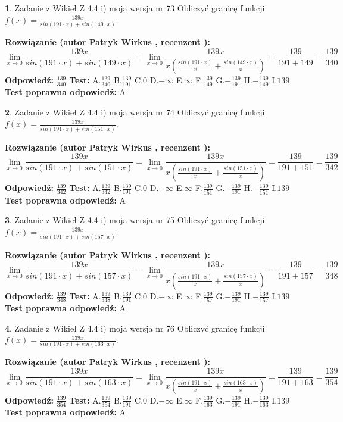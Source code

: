 \documentclass[12pt, a4paper]{article}
\theoremstyle{definition} %
\newtheorem{zad}{}
\newcommand{\zadStart}[1]{\begin{zad}#1\newline}
\newcommand{\zadStop}{\end{zad}}
\newcommand{\rozwStart}[2]{\noindent \textbf{Rozwiązanie (autor #1 , recenzent #2): }\newline}
\newcommand{\rozwStop}{\newline}
\newcommand{\odpStart}{\noindent \textbf{Odpowiedź:}\newline}
\newcommand{\odpStop}{\newline}
\newcommand{\testStart}{\noindent \textbf{Test:}\newline}
\newcommand{\testStop}{\newline}
\newcommand{\kluczStart}{\noindent \textbf{Test poprawna odpowiedź:}\newline}
\newcommand{\kluczStop}{\newline}
\begin{document}
\zadStart{Zadanie z Wikieł Z 4.4 i) moja wersja nr 73}
Obliczyć granicę funkcji $f(x)=\frac{139x}{sin(191\cdot x) +sin(149\cdot x)}$.
\zadStop
\rozwStart{Patryk Wirkus}{}
$$\lim\limits_{x\to 0}\frac{139x}{sin(191\cdot x) +sin(149\cdot x)}=\lim\limits_{x\to 0}\frac{139x}{x(\frac{sin(191\cdot x)}{x}+\frac{sin(149\cdot x)}{x})}=\frac{139}{191+149} = \frac{139}{340}$$
\rozwStop
\odpStart
$\frac{139}{340}$
\odpStop
\testStart
A.$\frac{139}{340}$
B.$\frac{139}{191}$
C.$0$
D.$-\infty$
E.$\infty$
F.$\frac{139}{149}$
G.$-\frac{139}{191}$
H.$-\frac{139}{149}$
I.$139$
\testStop
\kluczStart
A
\kluczStop



\zadStart{Zadanie z Wikieł Z 4.4 i) moja wersja nr 74}
Obliczyć granicę funkcji $f(x)=\frac{139x}{sin(191\cdot x) +sin(151\cdot x)}$.
\zadStop
\rozwStart{Patryk Wirkus}{}
$$\lim\limits_{x\to 0}\frac{139x}{sin(191\cdot x) +sin(151\cdot x)}=\lim\limits_{x\to 0}\frac{139x}{x(\frac{sin(191\cdot x)}{x}+\frac{sin(151\cdot x)}{x})}=\frac{139}{191+151} = \frac{139}{342}$$
\rozwStop
\odpStart
$\frac{139}{342}$
\odpStop
\testStart
A.$\frac{139}{342}$
B.$\frac{139}{191}$
C.$0$
D.$-\infty$
E.$\infty$
F.$\frac{139}{151}$
G.$-\frac{139}{191}$
H.$-\frac{139}{151}$
I.$139$
\testStop
\kluczStart
A
\kluczStop



\zadStart{Zadanie z Wikieł Z 4.4 i) moja wersja nr 75}
Obliczyć granicę funkcji $f(x)=\frac{139x}{sin(191\cdot x) +sin(157\cdot x)}$.
\zadStop
\rozwStart{Patryk Wirkus}{}
$$\lim\limits_{x\to 0}\frac{139x}{sin(191\cdot x) +sin(157\cdot x)}=\lim\limits_{x\to 0}\frac{139x}{x(\frac{sin(191\cdot x)}{x}+\frac{sin(157\cdot x)}{x})}=\frac{139}{191+157} = \frac{139}{348}$$
\rozwStop
\odpStart
$\frac{139}{348}$
\odpStop
\testStart
A.$\frac{139}{348}$
B.$\frac{139}{191}$
C.$0$
D.$-\infty$
E.$\infty$
F.$\frac{139}{157}$
G.$-\frac{139}{191}$
H.$-\frac{139}{157}$
I.$139$
\testStop
\kluczStart
A
\kluczStop



\zadStart{Zadanie z Wikieł Z 4.4 i) moja wersja nr 76}
Obliczyć granicę funkcji $f(x)=\frac{139x}{sin(191\cdot x) +sin(163\cdot x)}$.
\zadStop
\rozwStart{Patryk Wirkus}{}
$$\lim\limits_{x\to 0}\frac{139x}{sin(191\cdot x) +sin(163\cdot x)}=\lim\limits_{x\to 0}\frac{139x}{x(\frac{sin(191\cdot x)}{x}+\frac{sin(163\cdot x)}{x})}=\frac{139}{191+163} = \frac{139}{354}$$
\rozwStop
\odpStart
$\frac{139}{354}$
\odpStop
\testStart
A.$\frac{139}{354}$
B.$\frac{139}{191}$
C.$0$
D.$-\infty$
E.$\infty$
F.$\frac{139}{163}$
G.$-\frac{139}{191}$
H.$-\frac{139}{163}$
I.$139$
\testStop
\kluczStart
A
\kluczStop
\end{document}

